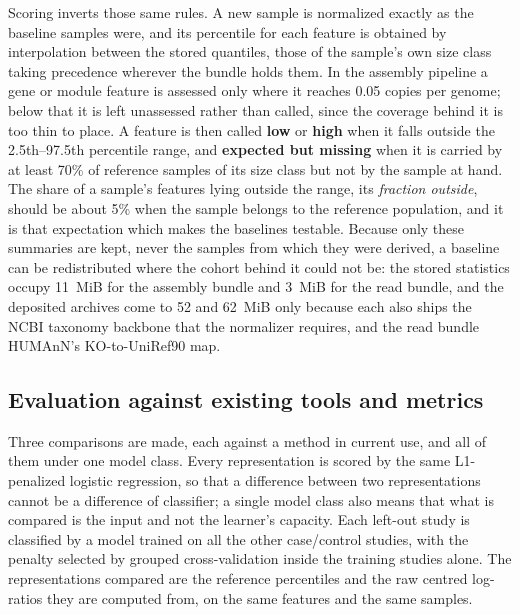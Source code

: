 \documentclass[conference]{IEEEtran}
\begin{document}
Scoring inverts those same rules. A new sample is normalized exactly as the baseline samples were, and its percentile for each feature is obtained by interpolation between the stored quantiles, those of the sample's own size class taking precedence wherever the bundle holds them. In the assembly pipeline a gene or module feature is assessed only where it reaches 0.05 copies per genome; below that it is left unassessed rather than called, since the coverage behind it is too thin to place. A feature is then called \textbf{low} or \textbf{high} when it falls outside the 2.5th--97.5th percentile range, and \textbf{expected but missing} when it is carried by at least 70\% of reference samples of its size class but not by the sample at hand. The share of a sample's features lying outside the range, its \emph{fraction outside}, should be about 5\% when the sample belongs to the reference population, and it is that expectation which makes the baselines testable. Because only these summaries are kept, never the samples from which they were derived, a baseline can be redistributed where the cohort behind it could not be: the stored statistics occupy 11~MiB for the assembly bundle and 3~MiB for the read bundle, and the deposited archives come to 52 and 62~MiB only because each also ships the NCBI taxonomy backbone that the normalizer requires, and the read bundle HUMAnN's KO-to-UniRef90 map.

\subsection{Evaluation against existing tools and metrics}

Three comparisons are made, each against a method in current use, and all of them under one model class. Every representation is scored by the same L1-penalized logistic regression, so that a difference between two representations cannot be a difference of classifier; a single model class also means that what is compared is the input and not the learner's capacity. Each left-out study is classified by a model trained on all the other case/control studies, with the penalty selected by grouped cross-validation inside the training studies alone. The representations compared are the reference percentiles and the raw centred log-ratios they are computed from, on the same features and the same samples.
\end{document}
